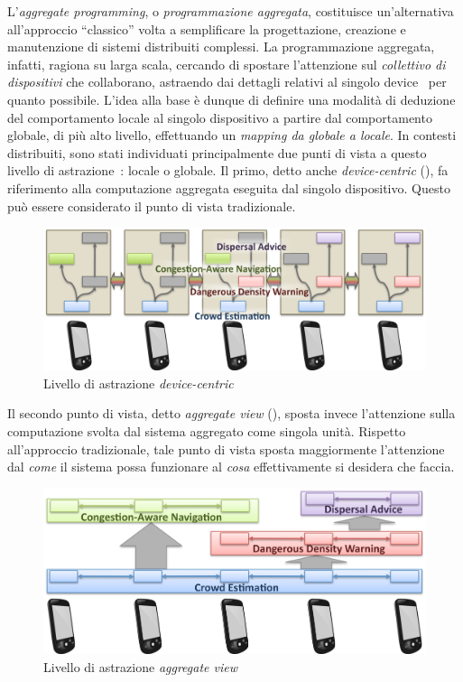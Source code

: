 L'\emph{aggregate programming}, o \emph{programmazione aggregata}, costituisce un'alternativa all'approccio ``classico''
volta a semplificare la progettazione, creazione e manutenzione di sistemi distribuiti complessi.
La programmazione aggregata, infatti, ragiona su larga scala, cercando di spostare l'attenzione sul \emph{collettivo di dispositivi} che collaborano,
astraendo dai dettagli relativi al singolo device~\cite{7274429} per quanto possibile.
L'idea alla base è dunque di definire una modalità di deduzione del comportamento locale al singolo dispositivo a partire dal comportamento globale, di più alto livello,
effettuando un \emph{mapping da globale a locale}.
In contesti distribuiti, sono stati individuati principalmente due punti di vista a questo livello di astrazione~\cite{aggregatescala-pmldc2016}: locale o globale.
Il primo, detto anche \emph{device-centric} (), fa riferimento alla computazione aggregata eseguita dal singolo dispositivo.
Questo può essere considerato il punto di vista tradizionale.

\begin{figure}[htbp]
  \centering
  \includegraphics[width=.5\textwidth]{res/fig/device-centric.png}
  \caption{Livello di astrazione \emph{device-centric}}%
  \label{fig:device-centric}
\end{figure}

Il secondo punto di vista, detto \emph{aggregate view} (), sposta invece l'attenzione sulla computazione svolta dal sistema aggregato come singola unità.
Rispetto all'approccio tradizionale, tale punto di vista sposta maggiormente l'attenzione dal \emph{come} il sistema possa funzionare
al \emph{cosa} effettivamente si desidera che faccia.

\begin{figure}[htbp]
  \centering
  \includegraphics[width=.5\textwidth]{res/fig/aggregate.png}
  \caption{Livello di astrazione \emph{aggregate view}}%
  \label{fig:aggregate}
\end{figure}

